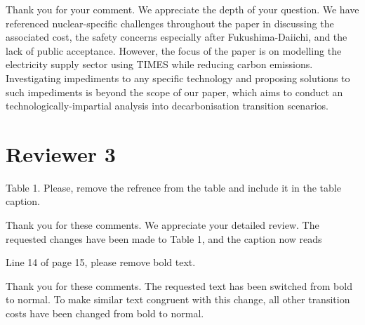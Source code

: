 \documentclass[answers,11pt]{exam}
\begin{document}
\begin{questions}
        \begin{solution}
        
                 Thank you for your comment. We appreciate the depth of your question. We have referenced nuclear-specific challenges throughout the paper in discussing the associated cost, the safety concerns especially after Fukushima-Daiichi, and the lack of public acceptance. However, the focus of the paper is on modelling the electricity supply sector using TIMES while reducing carbon emissions. Investigating impediments to any specific technology and proposing solutions to such impediments is beyond the scope of our paper, which aims to conduct an technologically-impartial analysis into decarbonisation transition scenarios.
                 
                 
        \end{solution} 
        

        \section{Reviewer 3}
        
         \question Table 1. Please, remove the refrence from the table and include it in the table caption.
        \begin{solution}
                Thank you for these comments. We appreciate your detailed review. The requested changes have been made to Table 1, and the caption now reads
                
        \end{solution}  

         \question Line 14 of page 15, please remove bold text.
        \begin{solution}
                Thank you for these comments. The requested text has been switched from bold to normal. To make similar text congruent with this change, all other transition costs have been changed from bold to normal.
                
        \end{solution}  
 
\end{questions}
%
%
\end{document}
